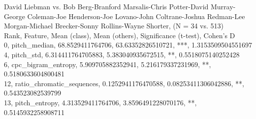 David Liebman vs. Bob Berg-Branford Marsalis-Chris Potter-David Murray-George Coleman-Joe Henderson-Joe Lovano-John Coltrane-Joshua Redman-Lee Morgan-Michael Brecker-Sonny Rollins-Wayne Shorter, (N = 34 vs. 513)\\
Rank, Feature, Mean (class), Mean (others), Significance (t-test), Cohen's D\\
0, pitch_median, 68.8529411764706, 63.63352826510721, ***, 1.3153509504551697\\
4, pitch_std, 6.314411764705883, 5.383040935672515, **, 0.5518075140252428\\
6, cpc_bigram_entropy, 5.909705882352941, 5.216179337231969, **, 0.5180633604800481\\
12, ratio_chromatic_sequences, 0.1252941176470588, 0.08253411306042886, **, 0.543523082539799\\
13, pitch_entropy, 4.313529411764706, 3.8596491228070176, **, 0.5145932258908711\\
